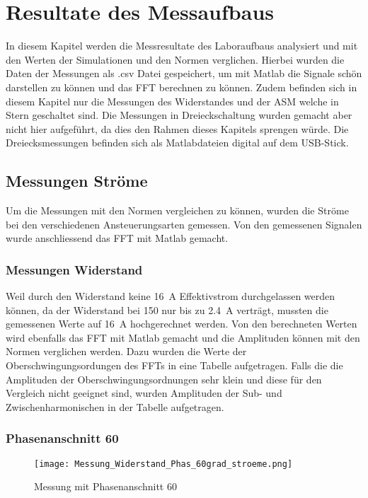 \section{Resultate des Messaufbaus}
In diesem Kapitel werden die Messresultate des Laboraufbaus analysiert und mit den Werten der Simulationen und den Normen verglichen. Hierbei wurden die Daten der Messungen als .csv Datei gespeichert, um mit Matlab die Signale schön darstellen zu können und das FFT berechnen zu können. 
Zudem befinden sich in diesem Kapitel nur die Messungen des Widerstandes und der ASM welche in Stern geschaltet sind. Die Messungen in Dreieckschaltung wurden gemacht aber nicht hier aufgeführt, da dies den Rahmen dieses Kapitels sprengen würde. Die Dreiecksmessungen befinden sich als Matlabdateien digital auf dem USB-Stick. 

\subsection{Messungen Ströme}
Um die Messungen mit den Normen vergleichen zu können, wurden die Ströme bei den verschiedenen Ansteuerungsarten gemessen. Von den gemessenen Signalen wurde anschliessend das FFT mit Matlab gemacht. 

\subsubsection{Messungen Widerstand}
Weil durch den Widerstand keine \SI{16}{A} Effektivstrom durchgelassen werden können, da der Widerstand bei \SI{150}{\Omega} nur bis zu \SI{2.4}{A} verträgt, mussten die gemessenen Werte auf \SI{16}{A} hochgerechnet werden. Von den berechneten Werten wird ebenfalls das FFT mit Matlab gemacht und die Amplituden können mit den Normen verglichen werden. Dazu wurden die Werte der Oberschwingungsordungen des FFTs in eine Tabelle aufgetragen. Falls die die Amplituden der Oberschwingungsordnungen sehr klein und diese für den Vergleich nicht geeignet sind, wurden Amplituden der Sub- und Zwischenharmonischen in der Tabelle aufgetragen.

\subsubsection*{Phasenanschnitt 60\textdegree}

\begin{figure}[ht!]
	\centering
	\texttt{[image: Messung\_Widerstand\_Phas\_60grad\_stroeme.png]}	
	\caption{Messung mit Phasenanschnitt 60\textdegree}\label{fig:Mess_Widerstand_Phas_60grad_stroeme}
\end{figure}

